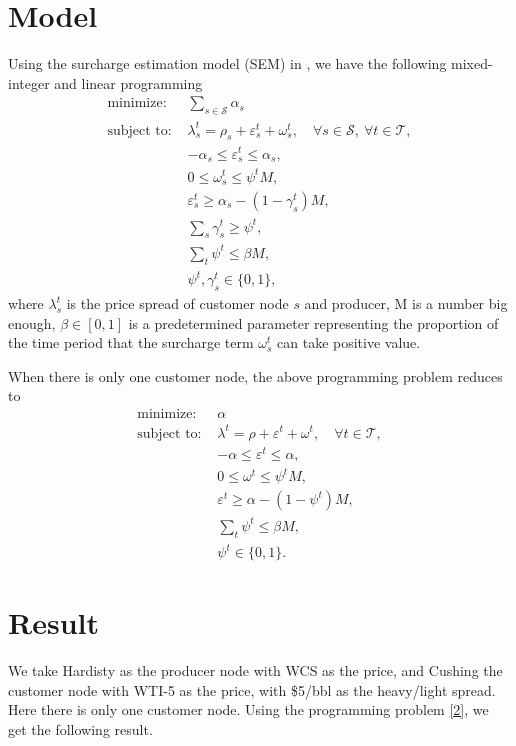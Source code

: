 \documentclass[11pt]{m2pi}
\newcommand{\cS}{\mathcal{S}}
\newcommand{\cT}{\mathcal{T}}
\newcommand{\ves}{\varepsilon}
\begin{document}
\section{Model}
Using the surcharge estimation model (SEM) in \cite{Zhu2020}, we have the following mixed-integer and linear programming 
\begin{equation}\label{1}
\begin{split}
\text{minimize: } &\sum_{s\in\cS} \alpha_s\\
\text{subject to: } &\lambda_s^t = \rho_s + \ves_s^t +\omega_s^t, \quad \forall s\in\cS,~\forall t\in\cT,\\
&-\alpha_s\leq\ves_s^t \leq \alpha_s,\\
&0\leq\omega_s^t\leq \psi^t M,\\
&\ves_s^t \geq \alpha_s - (1-\gamma_s^t) M,\\
&\sum_s \gamma_s^t\geq \psi^t,\\
&\sum_t \psi^t \leq \beta M,\\
&\psi^t, \gamma_s^t \in\{0,1\},
\end{split}
\end{equation}
where $\lambda_{s}^{t}$ is the price spread of customer node $s$ and producer, M is a number big enough, $\beta\in[0,1]$ is a predetermined parameter representing the proportion of the time period that the surcharge term $\omega_s^t$ can take positive value.

When there is only one customer node, the above programming problem reduces to
\begin{equation}\label{2}
\begin{split}
\text{minimize: } &\alpha\\
\text{subject to: } &\lambda^t = \rho + \ves^t +\omega^t, \quad \forall t\in\cT,\\
&-\alpha\leq\ves^t \leq \alpha,\\
&0\leq\omega^t\leq \psi^t M,\\
&\ves^t \geq \alpha - (1-\psi^t) M,\\
&\sum_t \psi^t \leq \beta M,\\
&\psi^t \in\{0,1\}.
\end{split}
\end{equation}


\section{Result}
We take Hardisty as the producer node with WCS as the price, and Cushing the customer node with WTI-5 as the price, with \$5/bbl as the heavy/light spread. Here there is only one customer node. Using the programming problem \eqref{2}, we get the following result.
\end{document}
